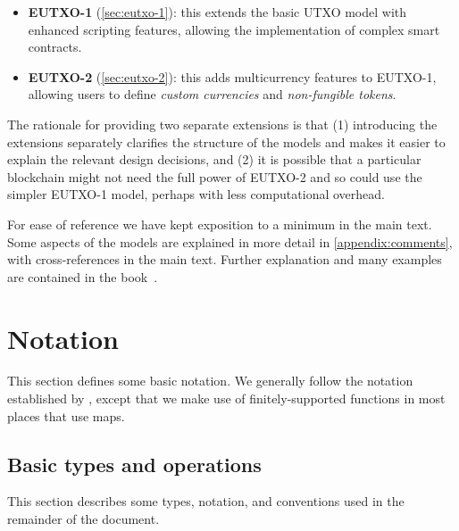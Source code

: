 \documentclass[a4paper]{article}
\begin{document}
\begin{itemize}
  \item \textbf{EUTXO-1} (\cref{sec:eutxo-1}): this extends the
    basic UTXO model with enhanced scripting features, allowing the
    implementation of complex smart contracts.
  \item \textbf{EUTXO-2} (\cref{sec:eutxo-2}): this adds
    multicurrency features to EUTXO-1, allowing users to define
    \textit{custom currencies} and \textit{non-fungible tokens}.
\end{itemize}


\medskip

The rationale for providing two separate extensions is that (1)
introducing the extensions separately clarifies the structure of the
models and makes it easier to explain the relevant design decisions,
and (2) it is possible that a particular blockchain might not need the
full power of EUTXO-2 and so could use the simpler EUTXO-1 model,
perhaps with less computational overhead.

\medskip

For ease of reference we have kept exposition to a minimum in the main
text.  Some aspects of the models are explained in more detail
in \cref{appendix:comments}, with cross-references in the main
text.  Further explanation and many examples are contained in the
book~\citep{Plutus-book}.


\section{Notation}
This section defines some basic notation.  We generally follow the
notation established by \citep{Zahnentferner18-UTxO}, except that we make use
of finitely-supported functions in most places that \citep{Zahnentferner18-UTxO}
use maps.

\subsection{Basic types and operations}
\label{sec:basic-notation}

This section describes some types, notation, and
conventions used in the remainder of the document.
\end{document}
